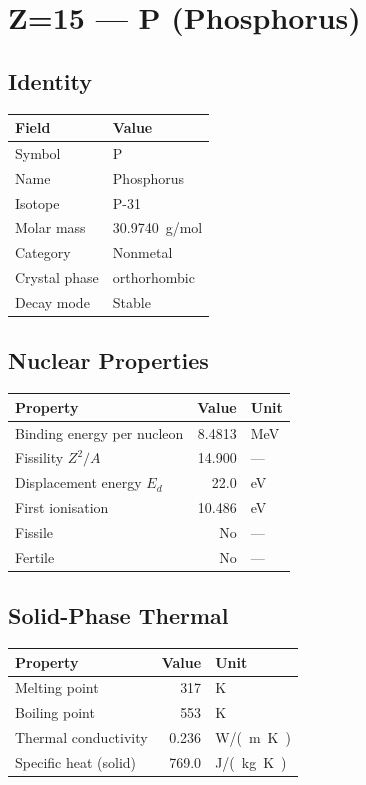 \documentclass[11pt,a4paper]{article}
\begin{document}
\newpage

\section{Z=15 --- P (Phosphorus)}
\label{sec:Z15}

\subsection{Identity}
\begin{tabular}{ll}
  \toprule
  Field & Value \\
  \midrule
  Symbol & P \\
  Name & Phosphorus \\
  Isotope & P-31 \\
  Molar mass & \SI{30.9740}{g/mol} \\
  Category & Nonmetal \\
  Crystal phase & orthorhombic \\
  Decay mode & Stable \\
  \bottomrule
\end{tabular}

\subsection{Nuclear Properties}
\begin{tabular}{lrl}
  \toprule
  Property & Value & Unit \\
  \midrule
  Binding energy per nucleon & 8.4813 & \si{MeV} \\
  Fissility $Z^2/A$ & 14.900 & --- \\
  Displacement energy $E_d$ & 22.0 & \si{eV} \\
  First ionisation & 10.486 & \si{eV} \\
  Fissile & No & --- \\
  Fertile & No & --- \\
  \bottomrule
\end{tabular}

\subsection{Solid-Phase Thermal}
\begin{tabular}{lrl}
  \toprule
  Property & Value & Unit \\
  \midrule
  Melting point & 317 & \si{K} \\
  Boiling point & 553 & \si{K} \\
  Thermal conductivity & 0.236 & \si{W/(m.K)} \\
  Specific heat (solid) & 769.0 & \si{J/(kg.K)} \\
  \bottomrule
\end{tabular}
\end{document}
